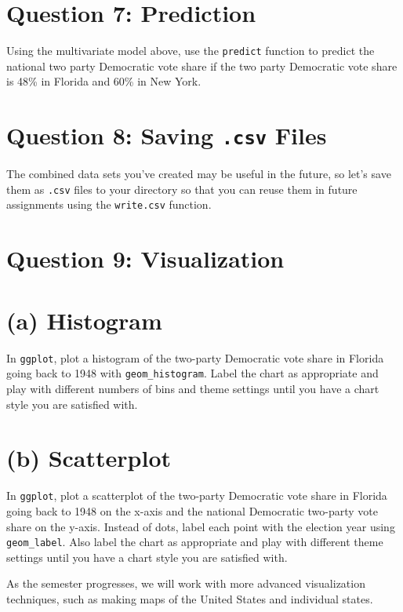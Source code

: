 \documentclass[
]{article}
\begin{document}
\section{Question 7: Prediction}\label{question-7-prediction}

Using the multivariate model above, use the \texttt{predict} function to
predict the national two party Democratic vote share if the two party
Democratic vote share is 48\% in Florida and 60\% in New York.

\section{\texorpdfstring{Question 8: Saving \texttt{.csv}
Files}{Question 8: Saving .csv Files}}\label{question-8-saving-.csv-files}

The combined data sets you've created may be useful in the future, so
let's save them as \texttt{.csv} files to your directory so that you can
reuse them in future assignments using the \texttt{write.csv} function.

\section{Question 9: Visualization}\label{question-9-visualization}

\section{(a) Histogram}\label{a-histogram}

In \texttt{ggplot}, plot a histogram of the two-party Democratic vote
share in Florida going back to 1948 with \texttt{geom\_histogram}. Label
the chart as appropriate and play with different numbers of bins and
theme settings until you have a chart style you are satisfied with.

\section{(b) Scatterplot}\label{b-scatterplot}

In \texttt{ggplot}, plot a scatterplot of the two-party Democratic vote
share in Florida going back to 1948 on the x-axis and the national
Democratic two-party vote share on the y-axis. Instead of dots, label
each point with the election year using \texttt{geom\_label}. Also label
the chart as appropriate and play with different theme settings until
you have a chart style you are satisfied with.

As the semester progresses, we will work with more advanced
visualization techniques, such as making maps of the United States and
individual states.
\end{document}
